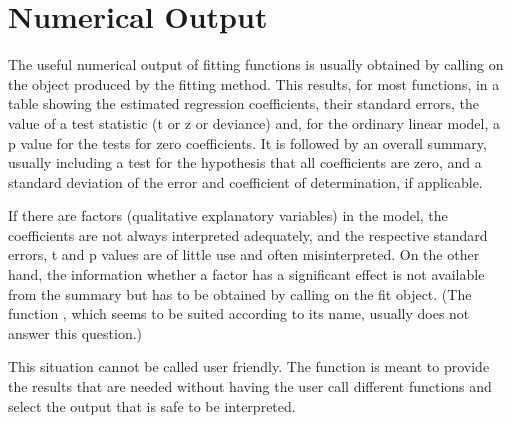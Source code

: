 \documentclass[11pt]{article}\usepackage[]{graphicx}\usepackage[]{color}
\begin{document}
\section{Numerical Output}
The useful numerical output of fitting functions is usually obtained by
calling  on the object produced by the fitting method.
This results, for most functions, in a table showing the estimated
regression coefficients, their standard errors, the value of a test
statistic (t or z or deviance) and, for the 
ordinary linear model, a p value for the tests for zero coefficients. 
It is followed by an overall summary, usually including a test for
the hypothesis that all coefficients are zero, and a standard deviation of
the error and coefficient of determination, if applicable.

If there are factors (qualitative explanatory variables) in the model, 
the coefficients are not always interpreted adequately, and the 
respective standard errors, t and p values are of little use and often
misinterpreted. 
On the other hand, the information whether a factor has a significant
effect is not available from the summary but has to be obtained by calling 
 on the fit object. 
(The function , which seems to be suited according to its
name, usually does not answer this question.)

This situation cannot be called user friendly.
The function  is meant to provide the results that are needed
without having the user call different functions and select the 
output that is safe to be interpreted.
\end{document}
